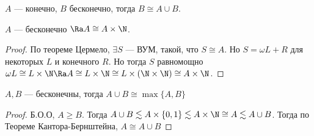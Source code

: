 \begin{theorem}
    \(A\) --- конечно, \(B\) бесконечно, тогда \(B \cong A \cup B\).
\end{theorem}

\begin{theorem}
    \(A\) --- бесконечно \(\Ra A \cong A \times \N\).
\end{theorem}
\begin{proof}
    По теореме Цермело, \(\exists S\) --- ВУМ, такой, что \(S \cong A\). Но \(S = \omega L + R\) для некоторых \(L\) и конечного \(R\). Но тогда \(S\) равномощно \(\omega L \cong L \times \N \Ra A \cong L \times \N \cong L \times (\N \times \N) \cong A \times \N\).
\end{proof}

\begin{theorem}
    \(A, B\) --- бесконечны, тогда \(A \cup B \cong \max\{A, B\}\)
\end{theorem}
\begin{proof}
    Б.О.О, \(A \ge B\). Тогда \(A \cup B \lesssim A \times \{0, 1\} \lesssim  A \times \N \cong A \lesssim A \cup B\). Тогда по Теореме Кантора-Бернштейна, \(A \cong A \cup B\)
\end{proof}

